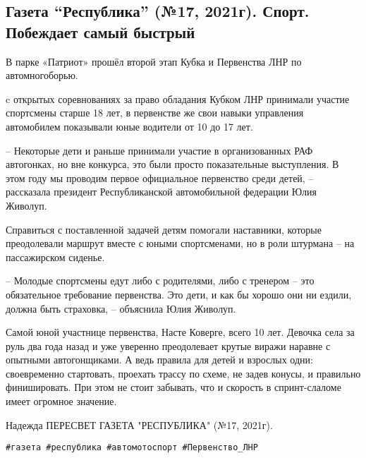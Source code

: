  
 
 
 
 
\subsection{Газета \enquote{Республика} (№17, 2021г).  Спорт.  Побеждает самый быстрый}
\label{sec:05_05_2021.fb.respublikalnr.1.lnr_sport_avtogonka}

В парке «Патриот» прошёл второй этап Кубка и Первенства ЛНР по автомногоборью.

c открытых соревнованиях за право обладания Кубком ЛНР принимали участие
спортсмены старше 18 лет, в первенстве же свои навыки управления автомобилем
показывали юные водители от 10 до 17 лет.

– Некоторые дети и раньше принимали участие в организованных РАФ автогонках, но
вне конкурса, это были просто показательные выступления. В этом году мы
проводим первое официальное первенство среди детей, – рассказала президент
Республиканской автомобильной федерации Юлия Живолуп.

Справиться с поставленной задачей детям помогали наставники, которые
преодолевали маршрут вместе с юными спортсменами, но в роли штурмана – на
пассажирском сиденье.

– Молодые спортсмены едут либо с родителями, либо с тренером – это обязательное
требование первенства. Это дети, и как бы хорошо они ни ездили, должна быть
страховка, – объяснила Юлия Живолуп.

Самой юной участнице первенства, Насте Коверге, всего 10 лет. Девочка села за
руль два года назад и уже уверенно преодолевает крутые виражи наравне с
опытными автогонщиками. А ведь правила для детей и взрослых одни: своевременно
стартовать, проехать трассу по схеме, не задев конусы, и правильно
финишировать. При этом не стоит забывать, что и скорость в спринт-слаломе имеет
огромное значение.

Надежда ПЕРЕСВЕТ ГАЗЕТА "РЕСПУБЛИКА" (№17, 2021г).

\verb|#газета #республика #автомотоспорт #Первенство_ЛНР|
